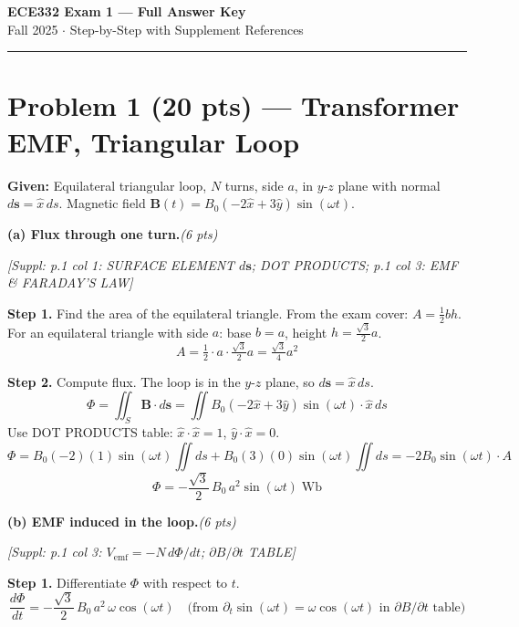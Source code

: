 \documentclass[11pt,letterpaper]{article}
\newcommand{\refbox}[1]{\textcolor{ref}{\textit{[Suppl: #1]}}}
\newcommand{\ptag}[1]{\hfill\textit{(#1 pts)}}
\newcommand{\step}[1]{\medskip\noindent\textbf{Step #1.}\enspace}
\begin{document}
\begin{center}
{\LARGE\bfseries ECE332 Exam 1 --- Full Answer Key}\\[4pt]
{\large Fall 2025 $\cdot$ Step-by-Step with Supplement References}
\end{center}

\noindent\rule{\linewidth}{0.6pt}

\section*{Problem 1 (20 pts) --- Transformer EMF, Triangular Loop}

\textbf{Given:} Equilateral triangular loop, $N$ turns, side $a$, in $y$-$z$ plane with normal
$d\mathbf{s}=\hat{x}\,ds$. Magnetic field $\mathbf{B}(t)=B_0(-2\hat{x}+3\hat{y})\sin(\omega t)$.

\medskip

\textbf{(a) Flux through one turn.}\ptag{6}

\refbox{p.1 col 1: SURFACE ELEMENT $d\mathbf{s}$; DOT PRODUCTS; p.1 col 3: EMF \& FARADAY'S LAW}

\step{1} Find the area of the equilateral triangle.
From the exam cover: $A = \tfrac{1}{2}bh$.
For an equilateral triangle with side $a$: base $b=a$, height $h=\tfrac{\sqrt{3}}{2}a$.
\[
A = \tfrac{1}{2}\cdot a\cdot\tfrac{\sqrt{3}}{2}a = \tfrac{\sqrt{3}}{4}a^2
\]

\step{2} Compute flux. The loop is in the $y$-$z$ plane, so $d\mathbf{s}=\hat{x}\,ds$.
\[
\Phi = \iint_S \mathbf{B}\cdot d\mathbf{s}
= \iint B_0(-2\hat{x}+3\hat{y})\sin(\omega t)\cdot\hat{x}\,ds
\]
Use DOT PRODUCTS table: $\hat{x}\cdot\hat{x}=1$, $\hat{y}\cdot\hat{x}=0$.
\[
\Phi = B_0(-2)(1)\sin(\omega t)\iint ds + B_0(3)(0)\sin(\omega t)\iint ds
= -2B_0\sin(\omega t)\cdot A
\]
\[
\boxed{\Phi = -\frac{\sqrt{3}}{2}\,B_0\,a^2\sin(\omega t)\;\text{Wb}}
\]

\medskip

\textbf{(b) EMF induced in the loop.}\ptag{6}

\refbox{p.1 col 3: $V_\text{emf}=-N\,d\Phi/dt$; $\partial B/\partial t$ TABLE}

\step{1} Differentiate $\Phi$ with respect to $t$.
\[
\frac{d\Phi}{dt} = -\frac{\sqrt{3}}{2}\,B_0\,a^2\,\omega\cos(\omega t)
\quad\text{(from } \partial_t\sin(\omega t)=\omega\cos(\omega t)\text{ in }\partial B/\partial t\text{ table)}
\]
\end{document}

